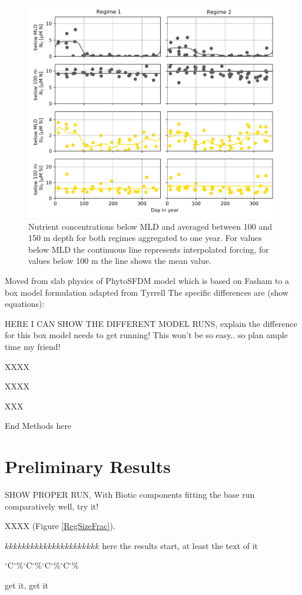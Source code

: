 \begin{figure}
\centering
\includegraphics[trim = 0mm 0mm 0mm 0mm, clip, width=0.65\linewidth]{./Chp2-Pre/NutsBELOWmldAsset1011.png}
\caption[Scheme]{\small {Nutrient concentrations below MLD and averaged between 100 and 150 m depth for both regimes aggregated to one year. For values below MLD the continuous line represents interpolated forcing, for values below 100 m the line shows the mean value.}}
\label{BelowMLD}
\end{figure}

Moved from slab physics of PhytoSFDM model \citep{Acevedo-Trejos2016} which is based on Fasham \citep{Evans2003,Fasham1990a} to a box model formulation adapted from Tyrrell \citep{Tyrrell1999}
The specific differences are (show equations):

HERE I CAN SHOW THE DIFFERENT MODEL RUNS, explain the difference
for this box model needs to get running! This won't be so easy.. so plan ample time my friend!

XXXX

XXXX

XXX


End Methods here

\section{Preliminary Results}


SHOW PROPER RUN, With Biotic components fitting the base run comparatively well, try it!

XXXX (Figure \ref{RegSizeFrac}).



$kkkkkkkkkkkkkkkkkkkkkk$ here the results start, at least the text of it

$^{\circ}$C$^{\circ}$\%$^{\circ}$C$^{\circ}$\%$^{\circ}$C$^{\circ}$\%$^{\circ}$C$^{\circ}$\%


get it, get it



